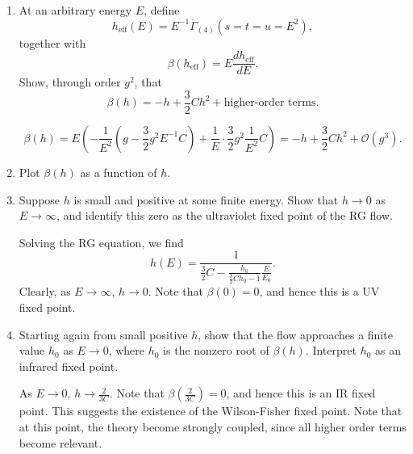 \begin{enumerate}[label=\alph*)]
    \item At an arbitrary energy $E$, define
    \begin{equation}
        h_{\mathrm{eff}}(E)
        =E^{-1}\overline\Gamma_{(4)}(s=t=u=E^2),
    \end{equation}
    together with
    \begin{equation}
        \beta(h_{\mathrm{eff}})
        =E\frac{dh_{\mathrm{eff}}}{dE}.
    \end{equation}
    Show, through order $g^2$, that
    \begin{equation}
        \beta(h)
        =-h+\frac{3}{2}Ch^2+\text{higher-order terms}.
    \end{equation}
    \begin{solution}
        \begin{equation}
            \beta(h) = E\left(-\frac{1}{E^2}\left(g - \frac32g^2E^{-1}C\right) + \frac{1}{E}\cdot \frac32 g^2\frac{1}{E^2}C\right) = -h + \frac32 Ch^2 + \mathcal{O}(g^3).
        \end{equation}
    \end{solution}

    \item Plot $\beta(h)$ as a function of $h$.

    \item Suppose $h$ is small and positive at some finite energy. Show that
    $h\to0$ as $E\to\infty$, and identify this zero as the ultraviolet fixed
    point of the RG flow.
    \begin{solution}
        Solving the RG equation, we find
        \begin{equation}
            h(E) = \frac{1}{\frac{3}{2}C-\frac{h_0}{\frac32Ch_0-1}\frac{E}{E_0}}.
        \end{equation}
        Clearly, as $E\to \infty$, $h \to 0$. Note that $\beta(0) = 0$, and hence this is a UV fixed point.
    \end{solution}

    \item Starting again from small positive $h$, show that the flow approaches
    a finite value $h_0$ as $E\to0$, where $h_0$ is the nonzero root of
    $\beta(h)$. Interpret $h_0$ as an infrared fixed point.
    \begin{solution}
        As $E \to 0$, $h \to \frac{2}{3C}$. Note that $\beta(\frac{2}{3C}) =0$, and hence this is an IR fixed point. This suggests the existence of the Wilson-Fisher fixed point. Note that at this point, the theory become strongly coupled, since all higher order terms become relevant.
    \end{solution}
\end{enumerate}
